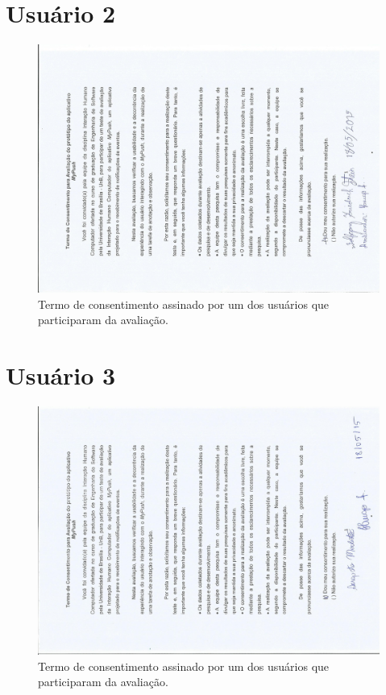 \begin{anexosenv}
   \section*{Usuário 2}
    \begin{figure}[!htbp]
      \centering
      \includegraphics[scale=0.6, angle=-90]{editaveis/figuras/wolfgang}
      \caption{Termo de consentimento assinado por um dos usuários que participaram da avaliação.}
      \label{termo_consentimento_1}
    \end{figure}
    \pagebreak
    
       \section*{Usuário 3}
    \begin{figure}[!htbp]
      \centering
      \includegraphics[scale=0.6, angle=-90]{editaveis/figuras/modesto}
      \caption{Termo de consentimento assinado por um dos usuários que participaram da avaliação.}
      \label{termo_consentimento_1}
    \end{figure}
    \pagebreak
    

\end{anexosenv}
